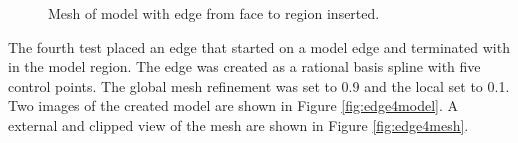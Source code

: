 \documentclass[a4paper, 12pt]{article}
\begin{document}
\begin{figure}[H]
  \centering
  \caption{Mesh of model with edge from face to region inserted.}
  \label{fig:edge3mesh}
\end{figure}

The fourth test placed an edge that started on a model edge and terminated 
with in the model region. 
The edge was created as a rational basis spline with five control points.
The global mesh refinement was set to 0.9 and the local set to 0.1. 
Two images of the created model are shown in Figure \ref{fig:edge4model}.
A external and clipped view of the mesh are shown in Figure \ref{fig:edge4mesh}.
\end{document}
